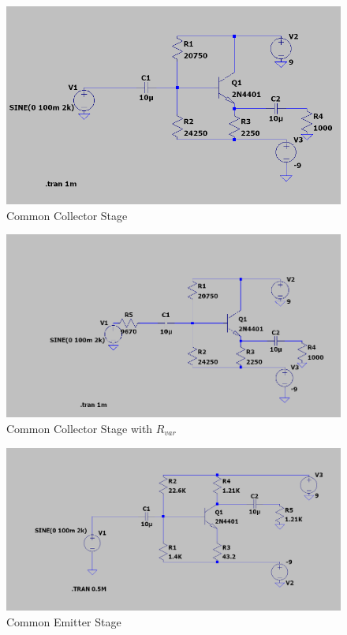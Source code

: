 \documentclass[12pt]{article}
\begin{document}
\begin{figure}[H]
    \centering
    \includegraphics[width=\linewidth]{Lab2/CC.png}
    \caption{Common Collector Stage}
\end{figure}

\begin{figure}[H]
    \centering
    \includegraphics[width=\linewidth]{Lab2/CC_Rin.png}
    \caption{Common Collector Stage with \(R_{var}\)}
\end{figure}

\begin{figure}[H]
    \centering
    \includegraphics[width=\linewidth]{Lab2/CE.png}
    \caption{Common Emitter Stage}
\end{figure}
\end{document}
